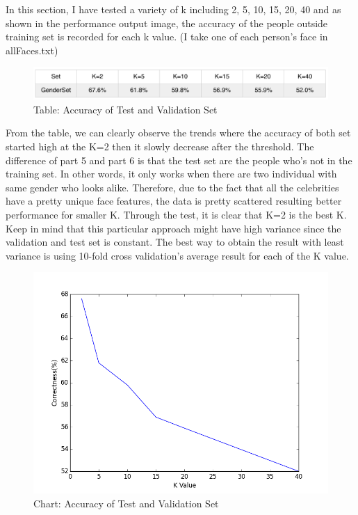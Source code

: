 \documentclass[12pt]{article} %
\begin{document}
In this section, I have tested a variety of k including 2, 5, 10, 15, 20, 40 and as shown in the performance output image, the accuracy of the people outside training set is recorded for each k value. (I take one of each person’s face in allFaces.txt)

\begin{figure}[H] %
  \centering 
  \begin{minipage}[b]{0.7\textwidth}
    \includegraphics[width=\textwidth]{part6_3}
    \caption{Table: Accuracy of Test and Validation Set}
  \end{minipage}
\end{figure}

From the table, we can clearly observe the trends where the accuracy of both set started high at the K=2 then it slowly decrease after the threshold. The difference of part 5 and part 6 is that the test set are the people who’s not in the training set. In other words, it only works when there are two individual with same gender who looks alike. Therefore, due to the fact that all the celebrities have a pretty unique face features, the data is pretty scattered resulting better performance for smaller K. Through the test, it is clear that K=2 is the best K. Keep in mind that this particular approach might have high variance since the validation and test set is constant. The best way to obtain the result with least variance is using 10-fold cross validation’s average result for each of the K value. 

\begin{figure}[H] %
  \centering 
  \begin{minipage}[b]{0.7\textwidth}
    \includegraphics[width=\textwidth]{part6_2}
    \caption{Chart: Accuracy of Test and Validation Set}
  \end{minipage}
\end{figure}
\end{document}

